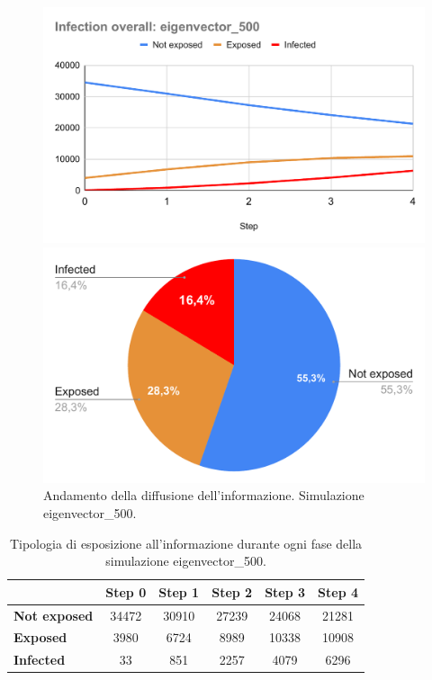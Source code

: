            \begin{figure}[H]
                \centering
                \begin{minipage}[c]{0.55\textwidth}
                    \includegraphics[width=\textwidth]{resources/charts/Infection overall_ eigenvector_500.pdf}
                \end{minipage}
                \hfill
                \begin{minipage}[c]{0.44\textwidth}
                    \includegraphics[width=\textwidth]{resources/charts/pie_eig_500.pdf}
                \end{minipage}
                \caption{Andamento della diffusione dell'informazione. Simulazione eigenvector\_500.}
            \end{figure}
            
        \begin{table}[H]
            \centering
            \begin{tabular}{l|c|c|c|c|c}
                        & Step 0 & Step 1 & Step 2 & Step 3 & Step 4 \\ \hline
            \textbf{Not exposed} & 34472  & 30910  & 27239  & 24068  & 21281  \\ \hline
            \textbf{Exposed}     & 3980   & 6724   & 8989   & 10338  & 10908  \\ \hline
            \textbf{Infected}    & 33     & 851    & 2257   & 4079   & 6296   \\
            \end{tabular}
            \caption{Tipologia di esposizione all'informazione durante ogni fase della simulazione eigenvector\_500.}
        \end{table}
        
